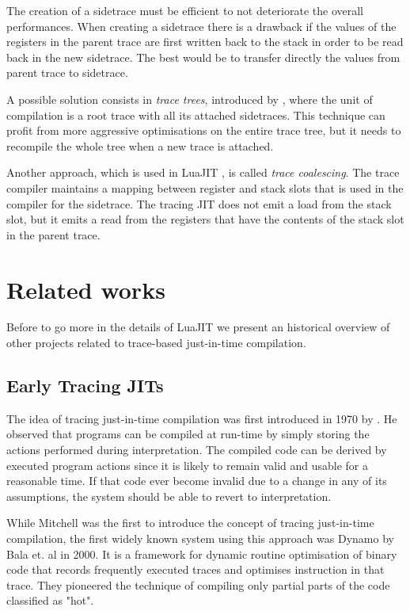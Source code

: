 \noindent
The creation of a sidetrace must be efficient to not deteriorate the overall performances. When creating a sidetrace there is a drawback if the values of the registers in the parent trace are first written back to the stack in order to be read back in the new sidetrace. The best would be to transfer directly the values from parent trace to sidetrace. 

A possible solution consists in \textit{trace trees}, introduced by \citeauthor{gal2006incremental} \cite{gal2006incremental}, where the unit of compilation is a root trace with all its attached sidetraces. This technique can profit from more aggressive optimisations on the entire trace tree, but it needs to recompile the whole tree when a new trace is attached. 

Another approach, which is used in LuaJIT \cite{pall2012luajit}, is called \textit{trace coalescing}. The trace compiler maintains a mapping between register and stack slots that is used in the compiler for the sidetrace. The tracing JIT does not emit a load from the stack slot, but it emits a read from the registers that have the contents of the stack slot in the parent trace.


\section{Related works}
\label{history-tracing-jits}
Before to go more in the details of LuaJIT we present an historical overview of other projects related to trace-based just-in-time compilation.

\subsection{Early Tracing JITs}
The idea of tracing just-in-time compilation was first introduced in 1970 by \citeauthor{mitchell1970design} \cite{mitchell1970design}. He observed that programs can be compiled at run-time by simply storing the actions performed during interpretation. The compiled code can be derived by executed program actions since it is likely to remain valid and usable for a reasonable time. If that code ever become invalid due to a change in any of its assumptions, the system should be able to revert to interpretation.

While Mitchell was the first to introduce the concept of tracing just-in-time compilation, the first widely known system using this approach was Dynamo by Bala et. al \cite{bala2000dynamo} in 2000. It is a framework for dynamic routine optimisation of binary code that records frequently executed traces and optimises instruction in that trace. They pioneered the technique of compiling only partial parts of the code classified as "hot".

